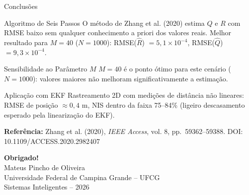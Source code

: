 \documentclass[aspectratio=169]{beamer}
\begin{document}
\begin{frame}{Conclusões}
    \begin{block}{Algoritmo de Seis Passos}
        O método de Zhang et al. (2020) estima $Q$ e $R$ com RMSE
        baixo sem qualquer conhecimento a priori dos valores reais.
        Melhor resultado para $M=40$ ($N=1000$):
        RMSE($\hat{R}$) $= 5{,}1\times10^{-4}$,
        RMSE($\hat{Q}$) $= 9{,}3\times10^{-4}$.
    \end{block}
    \vspace{0.2cm}
    \begin{block}{Sensibilidade ao Parâmetro $M$}
        $M=40$ é o ponto ótimo para este cenário ($N=1000$):
        valores maiores não melhoram significativamente a estimação.
    \end{block}
    \vspace{0.2cm}
    \begin{block}{Aplicação com EKF}
        Rastreamento 2D com medições de distância não lineares:
        RMSE de posição $\approx 0{,}4$ m, NIS dentro da faixa 75--84\%
        (ligeiro descasamento esperado pela linearização do EKF).
    \end{block}
    \vspace{0.2cm}
    \centering
    \small
    \textbf{Referência:} Zhang et al. (2020), \textit{IEEE Access}, vol. 8,
    pp.\ 59362--59388. DOI: 10.1109/ACCESS.2020.2982407
\end{frame}

\begin{frame}
    \vfill
    \begin{center}
        {\Huge \textbf{Obrigado!}}\\[1.5cm]
        {\large Mateus Pincho de Oliveira}\\[0.3cm]
        {\normalsize Universidade Federal de Campina Grande -- UFCG}\\[0.3cm]
        {\normalsize Sistemas Inteligentes -- 2026}
    \end{center}
    \vfill
\end{frame}
\end{document}
